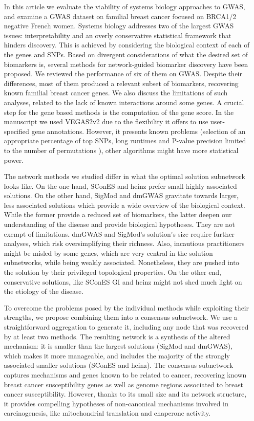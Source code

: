 \documentclass[twocolumn, 10pt]{article}
\begin{document}
In this article we evaluate the viability of systems biology approaches to GWAS, and examine a GWAS dataset on familial breast cancer focused on BRCA1/2 negative French women. Systems biology addresses two of the largest GWAS issues: interpretability and an overly conservative statistical framework that hinders discovery. This is achieved by considering the biological context of each of the genes and SNPs. Based on divergent considerations of what the desired set of biomarkers is, several methods for network-guided biomarker discovery have been proposed. We reviewed the performance of six of them on GWAS. Despite their differences, most of them produced a relevant subset of biomarkers, recovering known familial breast cancer genes. We also discuss the limitations of such analyses, related to the lack of known interactions around some genes. A crucial step for the gene based methods is the computation of the gene score. In the manuscript we used VEGAS2v2 \cite{mishra_vegas2:_2015} due to the flexibility it offers to use user-specified gene annotations. However, it presents known problems (selection of an appropriate percentage of top SNPs, long runtimes and P-value precision limited to the number of permutations \cite{nakka_gene_2016}), other algorithms might have more statistical power. 

The network methods we studied differ in what the optimal solution subnetwork looks like. On the one hand, SConES and heinz prefer small highly associated solutions. On the other hand, SigMod and dmGWAS gravitate towards larger, less associated solutions which provide a wide overview of the biological context. While the former provide a reduced set of biomarkers, the latter deepen our understanding of the disease and provide biological hypotheses. They are not exempt of limitations. dmGWAS and SigMod's solution's size require further analyses, which risk oversimplifying their richness. Also, incautious practitioners might be misled by some genes, which are very central in the solution subnetworks, while being weakly associated. Nonetheless, they are pushed into the solution by their privileged topological properties. On the other end, conservative solutions, like SConES GI and heinz might not shed much light on the etiology of the disease. 

To overcome the problems posed by the individual methods while exploiting their strengths, we propose combining them into a consensus subnetwork. We use a straightforward aggregation to generate it, including any node that was recovered by at least two methods. The resulting network is a synthesis of the altered mechanism: it is smaller than the largest solutions (SigMod and dmGWAS), which makes it more manageable, and includes the majority of the strongly associated smaller solutions (SConES and heinz). The consensus subnetwork captures mechanisms and genes known to be related to cancer, recovering known breast cancer susceptibility genes as well as genome regions associated to breast cancer susceptibility. However, thanks to its small size and its network structure, it provides compelling hypotheses of non-canonical mechanisms involved in carcinogenesis, like mitochondrial translation and chaperone activity.
\end{document}
